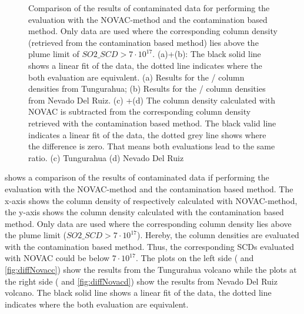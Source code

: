\documentclass  [
  paper    = a4,
  BCOR     = 10mm,
  twoside,
  fontsize = 12pt,
  fleqn,
  toc      = bibnumbered,
  toc      = listofnumbered,
  numbers  = noendperiod,
  headings = normal,
  listof   = leveldown,
  version  = 3.03
]                                       {scrreprt}
\begin{document}
\begin{figure}[h!]
{		\label{fig:diffratioc}}
	\caption{Comparison of the results of contaminated data for performing the evaluation with the NOVAC-method and the contamination based method. Only data are used where the corresponding   column density (retrieved from the contamination based method) lies above the plume limit of $SO2\_SCD>7\cdot 10^{17}$. (a)+(b): The black solid line shows a linear fit of the data, the dotted line indicates where the both evaluation are equivalent. (a) Results for the   /  column densities from Tungurahua; (b) Results for the   /  column densities from Nevado Del Ruiz. 
		(c) +(d) The column density calculated with NOVAC is subtracted from the corresponding column density retrieved with the contamination based method. The black valid line indicates a linear fit of the data, the dotted grey line shows where the difference is zero. That means both evaluations lead to the same ratio. (c) Tungurahua (d) Nevado Del Ruiz}
	\label{fig:diffratio}
\end{figure}
	 shows a comparison of the results of contaminated data if performing the evaluation with the NOVAC-method and the contamination based method. The x-axis shows the column density of  respectively   calculated with NOVAC-method, the y-axis shows the column density calculated with the contamination based method. Only data are used where the corresponding   column density lies above the plume limit ($SO2\_SCD>7\cdot 10^{17}$). Hereby, the column densities are evaluated with the contamination based method. Thus, the corresponding   SCDs evaluated with NOVAC could be below $7\cdot 10^{17}$.
	The plots on the left side ( and \ref{fig:diffNovacc}) show the results from the Tungurahua volcano while the plots at the right side ( and \ref{fig:diffNovacd}) show the results from Nevado Del Ruiz volcano. The black solid line shows a linear fit of the data, the dotted line indicates where the both evaluation are equivalent.\\
\end{document}
